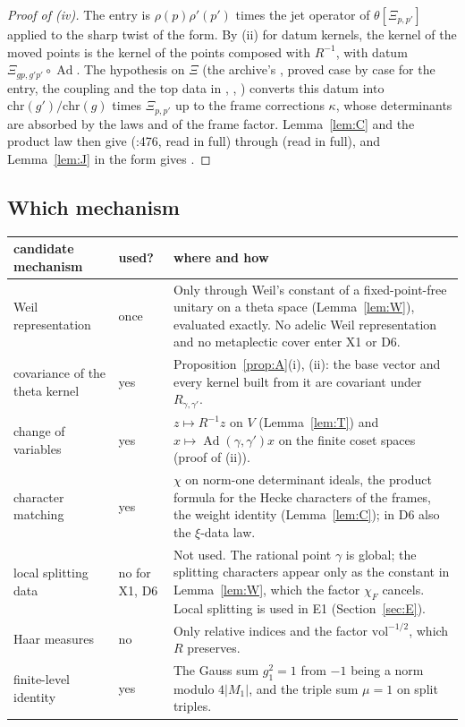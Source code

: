 \documentclass[11pt]{article}
\newcommand{\rr}{\raggedright\arraybackslash}
\newcommand{\Ad}{\operatorname{Ad}}
\theoremstyle{definition}
\theoremstyle{remark}
\begin{document}
\begin{proof}[Proof of (iv)]
The entry is $\rho(p)\rho'(p')$ times the jet operator of $\theta[\Xi_{p,p'}]$ applied to the sharp twist of the form. By (ii) for datum kernels, the kernel of the moved points is the kernel of the points composed with $R^{-1}$, with datum $\Xi_{gp,g'p'}\circ\Ad$. The hypothesis on $\Xi$ (the archive's , proved case by case for the entry, the coupling and the top data in , , ) converts this datum into $\mathrm{chr}(g')/\mathrm{chr}(g)$ times $\Xi_{p,p'}$ up to the frame corrections $\kappa$, whose determinants are absorbed by the laws  and  of the frame factor. Lemma~\ref{lem:C} and the product law then give  (:476, read in full) through  (read in full), and Lemma~\ref{lem:J} in the form  gives .
\end{proof}

\subsection{Which mechanism}

\begin{center}\small
\begin{longtable}{>{\rr}p{3.4cm}>{\rr}p{2.2cm}>{\rr}p{9.6cm}}
\toprule
candidate mechanism & used? & where and how\\
\midrule
\endhead
Weil representation & once & Only through Weil's constant of a fixed-point-free unitary on a theta space (Lemma~\ref{lem:W}), evaluated exactly. No adelic Weil representation and no metaplectic cover enter X1 or D6.\\
covariance of the theta kernel & yes & Proposition~\ref{prop:A}(i), (ii): the base vector and every kernel built from it are covariant under $R_{\gamma,\gamma'}$.\\
change of variables & yes & $z\mapsto R^{-1}z$ on $V$ (Lemma~\ref{lem:T}) and $x\mapsto\Ad(\gamma,\gamma')x$ on the finite coset spaces (proof of (ii)).\\
character matching & yes & $\chi$ on norm-one determinant ideals, the product formula for the Hecke characters of the frames, the weight identity (Lemma~\ref{lem:C}); in D6 also the $\xi$-data law.\\
local splitting data & no for X1, D6 & Not used. The rational point $\gamma$ is global; the splitting characters appear only as the constant in Lemma~\ref{lem:W}, which the factor $\chi_F$ cancels. Local splitting is used in E1 (Section~\ref{sec:E}).\\
Haar measures & no & Only relative indices and the factor $\mathrm{vol}^{-1/2}$, which $R$ preserves.\\
finite-level identity & yes & The Gauss sum $g_1^2=1$ from $-1$ being a norm modulo $4\lvert M_1\rvert$, and the triple sum $\mu=1$ on split triples.\\
\bottomrule
\end{longtable}
\end{center}
\end{document}
